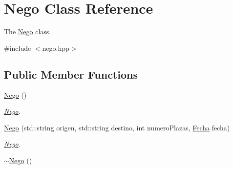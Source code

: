 \hypertarget{classNego}{}\section{Nego Class Reference}
\label{classNego}


The \hyperlink{classNego}{Nego} class.  




{\ttfamily \#include $<$nego.\+hpp$>$}

\subsection*{Public Member Functions}
\begin{DoxyCompactItemize}
\item 
\hyperlink{classNego_af997efc08cdc4e0fc654e6294ac4b08b}{Nego} ()
\begin{DoxyCompactList}\small\item\em \hyperlink{classNego}{Nego}. \end{DoxyCompactList}\item 
\hyperlink{classNego_a612bceb68453277f47491aa2cdaf0963}{Nego} (std\+::string origen, std\+::string destino, int numero\+Plazas, \hyperlink{classFecha}{Fecha} fecha)
\begin{DoxyCompactList}\small\item\em \hyperlink{classNego}{Nego}. \end{DoxyCompactList}\item 
\hypertarget{classNego_af7be4e019e1aa8aaae080e9900574c74}{}\hyperlink{classNego_af7be4e019e1aa8aaae080e9900574c74}{$\sim$\+Nego} ()\label{classNego_af7be4e019e1aa8aaae080e9900574c74}


\end{DoxyCompactItemize}
